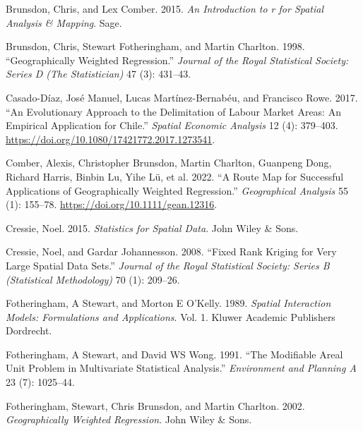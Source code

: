 \documentclass[
  letterpaper,
  krantz2]{style/krantz}
\newlength{\cslhangindent}
\newlength{\cslentryspacingunit} %
\newenvironment{CSLReferences}[2] %
 {%
  \setlength{\parindent}{0pt}
  \ifodd #1
  \let\oldpar\par
  \def\par{\hangindent=\cslhangindent\oldpar}
  \fi
  \setlength{\parskip}{#2\cslentryspacingunit}
 }%
 {}
\begin{document}
\begin{CSLReferences}{1}{0}
\leavevmode{}%
Brunsdon, Chris, and Lex Comber. 2015. \emph{An Introduction to r for
Spatial Analysis \& Mapping}. Sage.

\leavevmode{}%
Brunsdon, Chris, Stewart Fotheringham, and Martin Charlton. 1998.
{``Geographically Weighted Regression.''} \emph{Journal of the Royal
Statistical Society: Series D (The Statistician)} 47 (3): 431--43.

\leavevmode{}%
Casado-Díaz, José Manuel, Lucas Martínez-Bernabéu, and Francisco Rowe.
2017. {``An Evolutionary Approach to the Delimitation of Labour Market
Areas: An Empirical Application for Chile.''} \emph{Spatial Economic
Analysis} 12 (4): 379--403.
\url{https://doi.org/10.1080/17421772.2017.1273541}.

\leavevmode{}%
Comber, Alexis, Christopher Brunsdon, Martin Charlton, Guanpeng Dong,
Richard Harris, Binbin Lu, Yihe Lü, et al. 2022. {``A Route Map for
Successful Applications of Geographically Weighted Regression.''}
\emph{Geographical Analysis} 55 (1): 155--78.
\url{https://doi.org/10.1111/gean.12316}.

\leavevmode{}%
Cressie, Noel. 2015. \emph{Statistics for Spatial Data}. John Wiley \&
Sons.

\leavevmode{}%
Cressie, Noel, and Gardar Johannesson. 2008. {``Fixed Rank Kriging for
Very Large Spatial Data Sets.''} \emph{Journal of the Royal Statistical
Society: Series B (Statistical Methodology)} 70 (1): 209--26.

\leavevmode{}%
Fotheringham, A Stewart, and Morton E O'Kelly. 1989. \emph{Spatial
Interaction Models: Formulations and Applications}. Vol. 1. Kluwer
Academic Publishers Dordrecht.

\leavevmode{}%
Fotheringham, A Stewart, and David WS Wong. 1991. {``The Modifiable
Areal Unit Problem in Multivariate Statistical Analysis.''}
\emph{Environment and Planning A} 23 (7): 1025--44.

\leavevmode{}%
Fotheringham, Stewart, Chris Brunsdon, and Martin Charlton. 2002.
\emph{Geographically Weighted Regression}. John Wiley \& Sons.


\end{CSLReferences}
\end{document}
